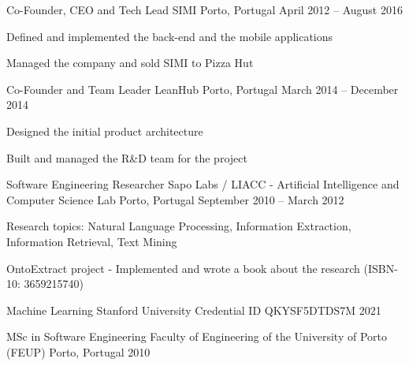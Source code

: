 \documentclass[]{awesome-cv}
\begin{document}
\begin{cventries}
	\vspace{-4mm}
	\cventry
	{Co-Founder, CEO and Tech Lead}
	{SIMI}
	{Porto, Portugal}
	{April 2012 – August 2016}
	{\begin{cvitems}
		\item {Defined and implemented the back-end and the mobile applications}
		\item {Managed the company and sold SIMI to Pizza Hut}
		\end{cvitems}}

	\vspace{-4mm}
	\cventry
	{Co-Founder and Team Leader}
	{LeanHub}
	{Porto, Portugal}
	{March 2014 – December 2014}
	{\begin{cvitems}
		\item {Designed the initial product architecture}
		\item {Built and managed the R\&D team for the project}
		\end{cvitems}}

	\vspace{-4mm}
	\cventry
	{Software Engineering Researcher}
	{Sapo Labs / LIACC - Artificial Intelligence and Computer Science Lab}
	{Porto, Portugal}
	{September 2010 – March 2012}
	{\begin{cvitems}
		\item {Research topics: Natural Language Processing, Information Extraction, Information Retrieval, Text Mining}
		\item {OntoExtract project - Implemented and wrote a book about the research (ISBN-10: 3659215740)}
		\end{cvitems}}
\end{cventries}
\vspace{-5mm}
\begin{cventries}
	\cventry
	{Machine Learning}
	{Stanford University}
	{Credential ID QKYSF5DTDS7M}
	{2021}
	{}

	\vspace{-5mm}
	\cventry
	{MSc in Software Engineering}
	{Faculty of Engineering of the University of Porto (FEUP)}
	{Porto, Portugal}
	{2010}
	{}

\end{cventries}
\end{document}
